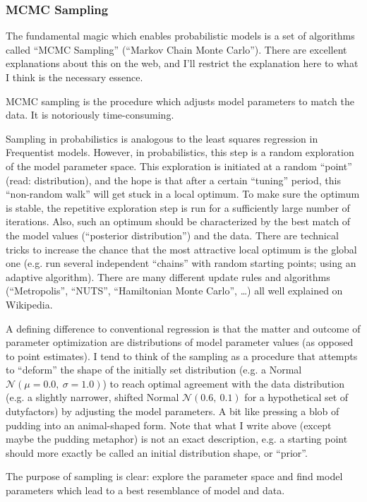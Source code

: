 \subsubsection{MCMC Sampling}
\label{workflow:sampling}
The fundamental magic which enables probabilistic models is a set of algorithms called ``MCMC Sampling'' (``Markov Chain Monte Carlo'').
There are excellent explanations about this on the web, and I'll restrict the explanation here to what I think is the necessary essence.

MCMC sampling is the procedure which adjusts model parameters to match the data.
It is notoriously time-consuming.

Sampling in probabilistics is analogous to the least squares regression in Frequentist models.
However, in probabilistics, this step is a random exploration of the model parameter space.
This exploration is initiated at a random ``point'' (read: distribution), and the hope is that after a certain ``tuning'' period, this ``non-random walk'' will get stuck in a local optimum.
To make sure the optimum is stable, the repetitive exploration step is run for a sufficiently large number of iterations.
Also, such an optimum should be characterized by the best match of the model values (``posterior distribution'') and the data.
There are technical tricks to increase the chance that the most attractive local optimum is the global one (e.g. run several independent ``chains'' with random starting points; using an adaptive algorithm).
There are many different update rules and algorithms (``Metropolis'', ``NUTS'', ``Hamiltonian Monte Carlo'', \ldots{}) all well explained on Wikipedia.

A defining difference to conventional regression is that the matter and outcome of parameter optimization are distributions of model parameter values (as opposed to point estimates).
I tend to think of the sampling as a procedure that attempts to ``deform'' the shape of the initially set distribution (e.g. a Normal \(\mathcal{{N}}\left(\mu = 0.0,\ \sigma = 1.0\right)\)) to reach optimal agreement with the data distribution (e.g. a slightly narrower, shifted Normal \(\mathcal{{N}}\left(0.6,\ 0.1\right)\) for a hypothetical set of dutyfactors) by adjusting the model parameters.
A bit like pressing a blob of pudding into an animal-shaped form.
Note that what I write above (except maybe the pudding metaphor) is not an exact description, e.g. a starting point should more exactly be called an initial distribution shape, or ``prior''.

The purpose of sampling is clear: explore the parameter space and find model parameters which lead to a best resemblance of model and data.


